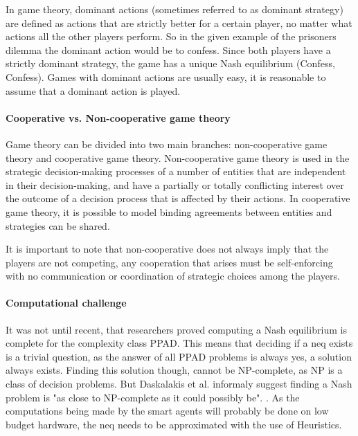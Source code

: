 In game theory, dominant actions (sometimes referred to as dominant strategy) are defined as actions that are strictly better for a certain player, no matter what actions all the other players perform. So in the given example of the prisoners dilemma the dominant action would be to confess. Since both players have a strictly dominant strategy, the game has a unique Nash equilibrium (Confess, Confess). Games with dominant actions are usually easy, it is reasonable to assume that a dominant action is played. 

\paragraph{Cooperative vs. Non-cooperative game theory} 
Game theory can be divided into two main branches: non-cooperative game theory and cooperative game theory. Non-cooperative game theory is used in the strategic decision-making processes of a number of entities that are independent in their decision-making, and have a partially or totally conflicting interest over the outcome of a decision process that is affected by their actions\cite{keypaper}. In cooperative game theory, it is possible to model binding agreements between entities and strategies can be shared. 

It is important to note that non-cooperative does not always imply that the players are not competing, any cooperation that arises must be self-enforcing with no communication or coordination of strategic choices among the players.

\paragraph{Computational challenge} 
It was not until recent, that researchers proved computing a Nash equilibrium is complete for the complexity class PPAD\cite{daskalakis2009complexity}. This means that deciding if a \ac{neq} exists is a trivial question, as the answer of all PPAD problems is always yes, a solution always exists. Finding this solution though, cannot be NP-complete, as NP is a class of decision problems. But Daskalakis et al. informaly suggest finding a Nash problem is "as close to NP-complete as it could possibly be". \cite{daskalakis2009complexity, Aaronson2012}. 
As the computations being made by the smart agents will probably be done on low budget hardware, the \ac{neq} needs to be  approximated with the use of Heuristics. \cite{MicrogridModellingPetrosAristidou,AumannGameTheoryAccomplish} 

